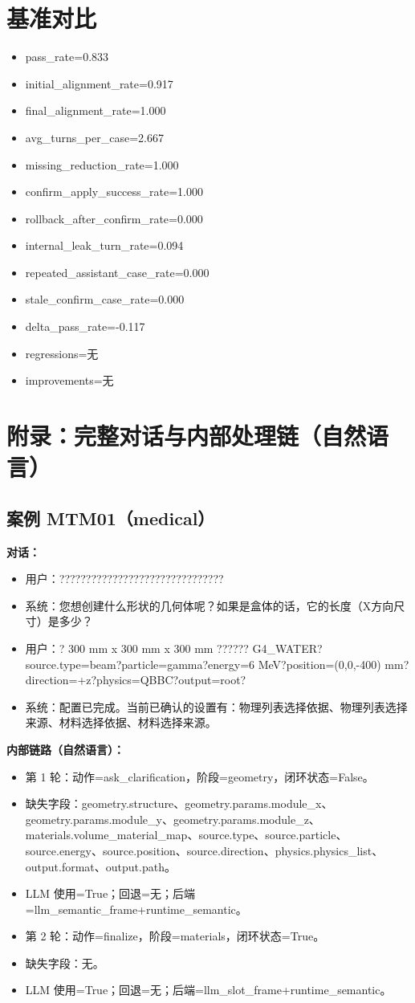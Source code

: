 \documentclass[11pt]{ctexart}
\begin{document}
\section{基准对比}
\begin{itemize}
\item pass\_rate=0.833
\item initial\_alignment\_rate=0.917
\item final\_alignment\_rate=1.000
\item avg\_turns\_per\_case=2.667
\item missing\_reduction\_rate=1.000
\item confirm\_apply\_success\_rate=1.000
\item rollback\_after\_confirm\_rate=0.000
\item internal\_leak\_turn\_rate=0.094
\item repeated\_assistant\_case\_rate=0.000
\item stale\_confirm\_case\_rate=0.000
\item delta\_pass\_rate=-0.117
\item regressions=无
\item improvements=无
\end{itemize}
\appendix
\section{附录：完整对话与内部处理链（自然语言）}
\subsection{案例 MTM01（medical）}
\textbf{对话：}
\begin{itemize}
\item 用户：???????????????????????????????
\item 系统：您想创建什么形状的几何体呢？如果是盒体的话，它的长度（X方向尺寸）是多少？
\item 用户：? 300 mm x 300 mm x 300 mm ?????? G4\_WATER?source.type=beam?particle=gamma?energy=6 MeV?position=(0,0,-400) mm?direction=+z?physics=QBBC?output=root?
\item 系统：配置已完成。当前已确认的设置有：物理列表选择依据、物理列表选择来源、材料选择依据、材料选择来源。
\end{itemize}
\textbf{内部链路（自然语言）：}
\begin{itemize}
\item 第 1 轮：动作=ask\_clarification，阶段=geometry，闭环状态=False。
\item 缺失字段：geometry.structure、geometry.params.module\_x、geometry.params.module\_y、geometry.params.module\_z、materials.volume\_material\_map、source.type、source.particle、source.energy、source.position、source.direction、physics.physics\_list、output.format、output.path。
\item LLM 使用=True；回退=无；后端=llm\_semantic\_frame+runtime\_semantic。
\item 第 2 轮：动作=finalize，阶段=materials，闭环状态=True。
\item 缺失字段：无。
\item LLM 使用=True；回退=无；后端=llm\_slot\_frame+runtime\_semantic。
\end{itemize}
\end{document}
